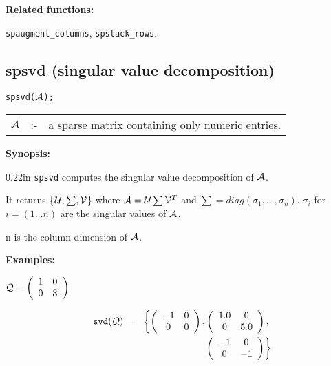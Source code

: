 {\bf Related functions:}

\hspace*{0.175in} {\tt spaugment\_columns}, {\tt spstack\_rows}.


\subsection{spsvd (singular value decomposition)}

\hspace*{0.175in} {\tt spsvd(${\cal A}$);}

\hspace*{0.1in}  
\begin{tabular}{l l l} 
${\cal A}$ &:-& a sparse matrix containing only numeric entries.
\end{tabular}

{\bf Synopsis:} %

\begin{addtolength}{\leftskip}{0.22in}
{\tt spsvd} computes the singular value decomposition of ${\cal A}$. 

It returns \{${\cal U},\sum,{\cal V}$\} where ${\cal A} = {\cal U} 
\sum {\cal V}^T$ and $\sum = diag(\sigma_{1}, \ldots ,\sigma_{n}). \; 
\sigma_{i}$ for $i= (1 \ldots n)$ are the singular values of ${\cal A}$.
 

n is the column dimension of ${\cal A}$.

\end{addtolength}

{\bf Examples:}

\begin{flushleft}
\hspace*{0.175in}
\begin{math}  
{\cal Q} = \left( \begin{array}{cc} 1 & 0 \\ 0 & 3 
\end{array} \right)
\end{math}  
\end{flushleft}

\begin{eqnarray}
\hspace*{0.1in}
{\tt svd({\cal Q})} & = & 
\left\{ 
        \left( \begin{array}{cc} -1 & 0 \\ 0 & 0 \end{array} \right), 
\left( \begin{array}{cc} 1.0 & 0 \\ 0 & 5.0 \end{array} \right), 
\right. \nonumber \\ & & \left. \: \; 
\, \left( \begin{array}{cc} -1 & 0 \\ 0 & -1 \end{array} \right)       
\right\} \nonumber \end{eqnarray}

